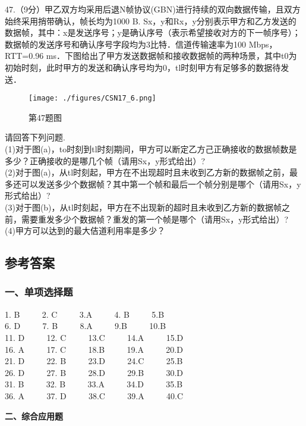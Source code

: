 47.（9分）甲乙双方均采用后退N帧协议(GBN)进行持续的双向数据传输，且双方始终采用捎带确认，帧长均为1000 B. Sx，y和Rx，y分别表示甲方和乙方发送的数据帧，其中：x是发送序号；y是确认序号（表示希望接收对方的下一帧序号）；数据帧的发送序号和确认序号字段均为3比特．信道传输速率为100 Mbps，RTT=0.96 ms．下图给出了甲方发送数据帧和接收数据帧的两种场景，其中t0为初始时刻，此时甲方的发送和确认序号均为0，tl时刻甲方有足够多的数据待发送．
\begin{figure}[ht]
\centering
\texttt{[image: ./figures/CSN17\_6.png]}
\caption{第47题图} \label{CSN17_fig6}
\end{figure}
请回答下列问题.  \\
(1)对于图(a)，to时刻到tl时刻期间，甲方可以断定乙方己正确接收的数据帧数是多少？正确接收的是哪几个帧（请用Sx，y形式给出）? \\
(2)对于图(a)，从tl时刻起，甲方在不出现超时且未收到乙方新的数据帧之前，最多还可以发送多少个数据帧？其中第一个帧和最后一个帧分别是哪个（请用Sx，y形式给出）? \\
(3)对于图(b)，从tl时刻起，甲方在不出现新的超时且未收到乙方新的数据帧之前，需要重发多少个数据帧？重发的第一个帧是哪个（请用Sx，y形式给出）? \\
(4)甲方可以达到的最大佶道利用率是多少？


\subsection{参考答案}
\subsubsection{一、单项选择题}

1. B  $\qquad$ 2. C $\qquad$ 3.A $\qquad$ 4. B $\qquad$ 5.B \\
6. D $\qquad$ 7. B $\qquad$ 8.A $\qquad$ 9.B $\qquad$ 10.B \\
11. D $\qquad$ 12. C $\qquad$ 13.C $\qquad$ 14.A $\qquad$ 15.D \\
16. A $\qquad$ 17. C $\qquad$ 18.B $\qquad$ 19.A $\qquad$ 20.D \\
21. D $\qquad$ 22. B $\qquad$ 23.D $\qquad$ 24.C $\qquad$ 25.B \\
26. D $\qquad$ 27. B $\qquad$ 28.D $\qquad$ 29.B $\qquad$ 30.D \\
31. B $\qquad$ 32. B $\qquad$ 33.A $\qquad$ 34.D $\qquad$ 35.B \\
36. A $\qquad$ 37. D $\qquad$ 38.C $\qquad$ 39.A $\qquad$ 40.C

  \textbf{二、综合应用题}

